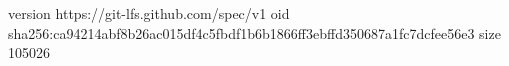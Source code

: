 version https://git-lfs.github.com/spec/v1
oid sha256:ca94214abf8b26ac015df4c5fbdf1b6b1866ff3ebffd350687a1fc7dcfee56e3
size 105026
